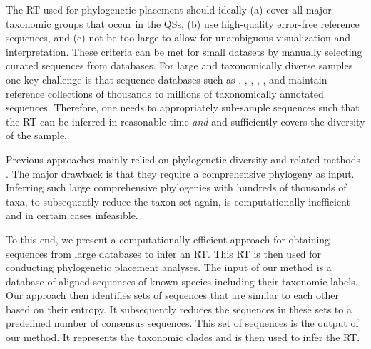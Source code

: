 The \acf{RT} used for phylogenetic placement should ideally
(a) cover all major taxonomic groups that occur in the \acp{QS},
(b) use high-quality error-free reference sequences, and
(c) not be too large to allow for unambiguous visualization and interpretation.
These criteria can be met for small datasets by manually selecting curated sequences from databases.
For large and taxonomically diverse samples one key challenge is that sequence databases such as
 \cite{DeSantis2006},  \cite{Abarenkov2010},  \cite{Guillou2012},
 \cite{Kim2012},  \cite{Quast2013}, and  \cite{Cole2014}
maintain reference collections of thousands to millions of taxonomically annotated sequences.
Therefore, one needs to appropriately sub-sample sequences such that the \ac{RT}
can be inferred in reasonable time {\em and} and sufficiently covers the diversity of the sample.

Previous approaches mainly relied on phylogenetic diversity
\cite{Faith1992,Pardi2005,Minh2006} and related methods \cite{Matsen2013}.
The major drawback is that they require a comprehensive phylogeny as input.
Inferring such large comprehensive phylogenies with hundreds of thousands of taxa,
to subsequently reduce the taxon set again, is computationally inefficient and in certain cases infeasible.

To this end, we present a computationally efficient approach
for obtaining sequences from large databases to infer an \ac{RT}.
This \ac{RT} is then used for conducting phylogenetic placement analyses.
The input of our method is a database of aligned sequences of known species including their taxonomic labels.
Our approach then identifies sets of sequences that are similar to each other based on their entropy.
It subsequently reduces the sequences in these sets to a predefined number of consensus sequences.
This set of sequences is the output of our method.
It represents the taxonomic clades and is then used to infer the \ac{RT}.

